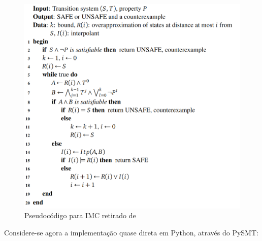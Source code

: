 \documentclass[11pt,a4paper]{report}%
\begin{document}
\begin{figure}[H]
      \centering
      \includegraphics[scale=0.66]{imc-pseudocode.png}
      \caption{Pseudocódigo para IMC retirado de \cite{interpolation_thesis}}
      \label{fig:imcpseudo}
\end{figure}

Considere-se agora a implementação quase direta em Python, através do PySMT:
\end{document}
